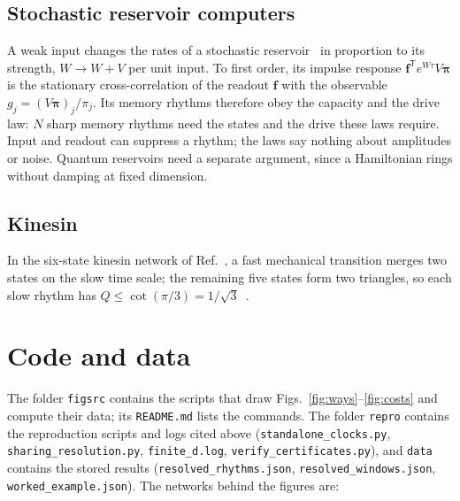 \subsection{Stochastic reservoir computers}\label{sec:reservoir}

A weak input changes the rates of a stochastic reservoir~\cite{ehlers2025} in proportion to its strength, $W\to W+V$ per unit input. To first order, its impulse response $\bm f^{\mathsf T}e^{W\tau}V\bm\pi$ is the stationary cross-correlation of the readout $\bm f$ with the observable $g_j=(V\bm\pi)_j/\pi_j$. Its memory rhythms therefore obey the capacity and the drive law: $N$ sharp memory rhythms need the states and the drive these laws require. Input and readout can suppress a rhythm; the laws say nothing about amplitudes or noise. Quantum reservoirs need a separate argument, since a Hamiltonian rings without damping at fixed dimension.

\subsection{Kinesin}

In the six-state kinesin network of Ref.~\cite{liepelt2007}, a fast mechanical transition merges two states on the slow time scale; the remaining five states form two triangles, so each slow rhythm has $Q\le\cot(\pi/3)=1/\sqrt3$~\cite{ohga2023}.

\section{Code and data}\label{sec:code}

The folder \texttt{figsrc} contains the scripts that draw Figs.~\ref{fig:ways}--\ref{fig:costs} and compute their data; its \texttt{README.md} lists the commands. The folder \texttt{repro} contains the reproduction scripts and logs cited above (\texttt{standalone\_clocks.py}, \texttt{sharing\_resolution.py}, \texttt{finite\_d.log}, \texttt{verify\_certificates.py}), and \texttt{data} contains the stored results (\texttt{resolved\_rhythms.json}, \texttt{resolved\_windows.json}, \texttt{worked\_example.json}). The networks behind the figures are:

